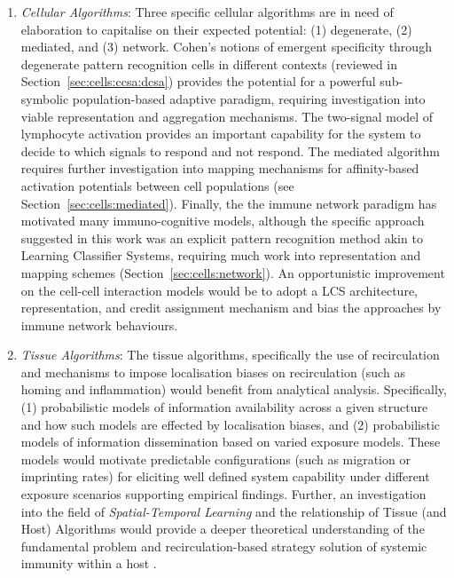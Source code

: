 \begin{enumerate}
	\item \emph{Cellular Algorithms}: Three specific cellular algorithms are in need of elaboration to capitalise on their expected potential: (1) degenerate, (2) mediated, and (3) network. Cohen's notions of emergent specificity through degenerate pattern recognition cells in different contexts (reviewed in Section~\ref{sec:cells:ccsa:dcsa}) provides the potential for a powerful sub-symbolic population-based adaptive paradigm, requiring investigation into viable representation and aggregation mechanisms. The two-signal model of lymphocyte activation provides an important capability for the system to decide to which signals to respond and not respond. The mediated algorithm requires further investigation into mapping mechanisms for affinity-based activation potentials between cell populations (see Section~\ref{sec:cells:mediated}). Finally, the the immune network paradigm has motivated many immuno-cognitive models, although the specific approach suggested in this work was an explicit pattern recognition method akin to Learning Classifier Systems, requiring much work into representation and mapping schemes (Section~\ref{sec:cells:network}). An opportunistic improvement on the cell-cell interaction models would be to adopt a LCS architecture, representation, and credit assignment mechanism and bias the approaches by immune network behaviours.
	
	\item \emph{Tissue Algorithms}: The tissue algorithms, specifically the use of recirculation and mechanisms to impose localisation biases on recirculation (such as homing and inflammation) would benefit from analytical analysis. Specifically, (1) probabilistic models of information availability across a given structure and how such models are effected by localisation biases, and (2) probabilistic models of information dissemination based on varied exposure models. These models would motivate predictable configurations (such as migration or imprinting rates) for eliciting well defined system capability under different exposure scenarios supporting empirical findings. Further, an investigation into the field of \emph{Spatial-Temporal Learning} and the relationship of Tissue (and Host) Algorithms would provide a deeper theoretical understanding of the fundamental problem and recirculation-based strategy solution of systemic immunity within a host \cite{Segel2002}.
	

\end{enumerate}
